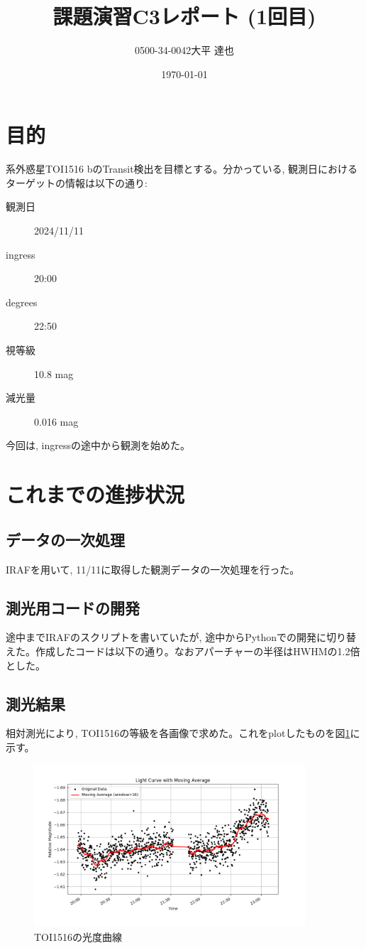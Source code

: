 \documentclass[dvipdfmx,a4paper]{jsarticle}
\begin{document}
\title{課題演習C3\quad レポート (1回目) }
\author{0500-34-0042\quad 大平 達也}
\date{\today}
\maketitle

\section{目的}
系外惑星TOI1516 bのTransit検出を目標とする。分かっている, 観測日におけるターゲットの情報は以下の通り: 
\begin{description}
  \item[観測日] 2024/11/11
  \item[ingress] 20:00
  \item[degrees] 22:50
  \item[視等級] 10.8 mag
  \item[減光量] 0.016 mag
\end{description}
今回は, ingressの途中から観測を始めた。
\section{これまでの進捗状況}
\subsection{データの一次処理}
IRAFを用いて, 11/11に取得した観測データの一次処理を行った。
\subsection{測光用コードの開発}
途中までIRAFのスクリプトを書いていたが, 途中からPythonでの開発に切り替えた。作成したコードは以下の通り。なおアパーチャーの半径はHWHMの1.2倍とした。 



\subsection{測光結果}
相対測光により, TOI1516の等級を各画像で求めた。これをplotしたものを図\ref{fig:toi1516}に示す。

\begin{figure}[H]
  \centering
  \includegraphics[width=0.9\textwidth]{./fig/light_curve_toi1516_with_moving_average.png}
  \caption{TOI1516の光度曲線}
  \label{fig:toi1516}
\end{figure}
\end{document}
